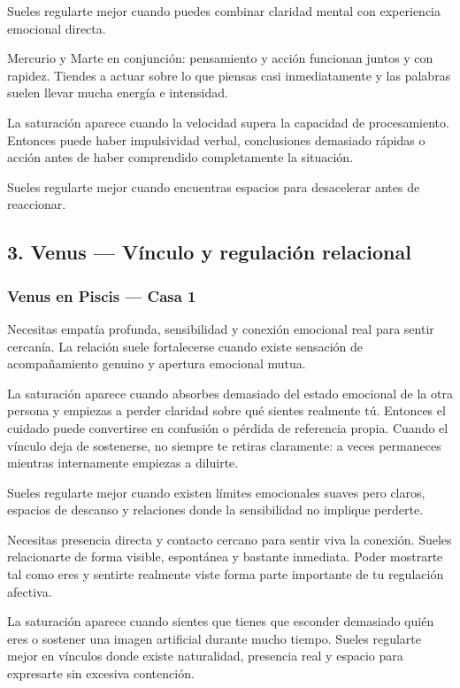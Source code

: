 \documentclass[11pt,a4paper]{article}
\begin{document}
Sueles regularte mejor cuando puedes combinar claridad mental con experiencia emocional directa.

Mercurio y Marte en conjunción: pensamiento y acción funcionan juntos y con rapidez. Tiendes a actuar sobre lo que piensas casi inmediatamente y las palabras suelen llevar mucha energía e intensidad.

La saturación aparece cuando la velocidad supera la capacidad de procesamiento. Entonces puede haber impulsividad verbal, conclusiones demasiado rápidas o acción antes de haber comprendido completamente la situación.

Sueles regularte mejor cuando encuentras espacios para desacelerar antes de reaccionar.

\vspace{0.8cm}

\subsection{3. Venus — Vínculo y regulación relacional}

\subsubsection*{Venus en Piscis — Casa 1}

\RaggedRight
Necesitas empatía profunda, sensibilidad y conexión emocional real para sentir cercanía. La relación suele fortalecerse cuando existe sensación de acompañamiento genuino y apertura emocional mutua.

La saturación aparece cuando absorbes demasiado del estado emocional de la otra persona y empiezas a perder claridad sobre qué sientes realmente tú. Entonces el cuidado puede convertirse en confusión o pérdida de referencia propia. Cuando el vínculo deja de sostenerse, no siempre te retiras claramente: a veces permaneces mientras internamente empiezas a diluirte.

Sueles regularte mejor cuando existen límites emocionales suaves pero claros, espacios de descanso y relaciones donde la sensibilidad no implique perderte.

Necesitas presencia directa y contacto cercano para sentir viva la conexión. Sueles relacionarte de forma visible, espontánea y bastante inmediata. Poder mostrarte tal como eres y sentirte realmente viste forma parte importante de tu regulación afectiva.

La saturación aparece cuando sientes que tienes que esconder demasiado quién eres o sostener una imagen artificial durante mucho tiempo. Sueles regularte mejor en vínculos donde existe naturalidad, presencia real y espacio para expresarte sin excesiva contención.
\end{document}
